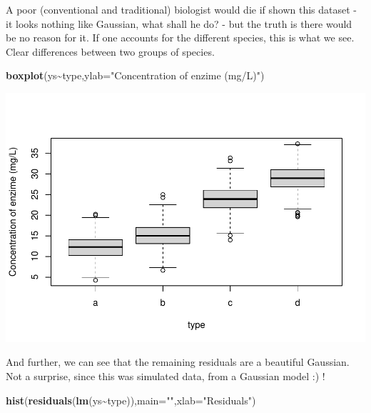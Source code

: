 \documentclass[
]{book}
\newenvironment{Shaded}{\begin{snugshade}}{\end{snugshade}}
\newcommand{\AttributeTok}[1]{\textcolor[rgb]{0.13,0.29,0.53}{#1}}
\newcommand{\FunctionTok}[1]{\textcolor[rgb]{0.13,0.29,0.53}{\textbf{#1}}}
\newcommand{\NormalTok}[1]{#1}
\newcommand{\SpecialCharTok}[1]{\textcolor[rgb]{0.81,0.36,0.00}{\textbf{#1}}}
\newcommand{\StringTok}[1]{\textcolor[rgb]{0.31,0.60,0.02}{#1}}
\begin{document}
A poor (conventional and traditional) biologist would die if shown this dataset - it looks nothing like Gaussian, what shall he do? - but the truth is there would be no reason for it. If one accounts for the different species, this is what we see. Clear differences between two groups of species.

\begin{Shaded}
\begin{Highlighting}[]
\FunctionTok{boxplot}\NormalTok{(ys}\SpecialCharTok{\textasciitilde{}}\NormalTok{type,}\AttributeTok{ylab=}\StringTok{"Concentration of enzime (mg/L)"}\NormalTok{)}
\end{Highlighting}
\end{Shaded}

\includegraphics{ECOMODbook_files/figure-latex/reg11-1.pdf}

And further, we can see that the remaining residuals are a beautiful Gaussian. Not a surprise, since this was simulated data, from a Gaussian model :) !

\begin{Shaded}
\begin{Highlighting}[]
\FunctionTok{hist}\NormalTok{(}\FunctionTok{residuals}\NormalTok{(}\FunctionTok{lm}\NormalTok{(ys}\SpecialCharTok{\textasciitilde{}}\NormalTok{type)),}\AttributeTok{main=}\StringTok{""}\NormalTok{,}\AttributeTok{xlab=}\StringTok{"Residuals"}\NormalTok{)}
\end{Highlighting}
\end{Shaded}
\end{document}
